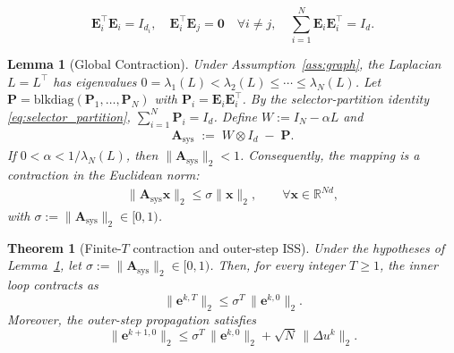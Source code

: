 \documentclass[10pt,a4paper]{amsart}
\newtheorem{lemma}{Lemma}
\newtheorem{theorem}{Theorem}
\begin{document}
\begin{equation}\label{eq:selector_partition}
\mathbf{E}_i^\top \mathbf{E}_i = I_{d_i},
\quad
\mathbf{E}_i^\top \mathbf{E}_j = \mathbf{0}\quad \forall i\neq j,
\quad
\sum_{i=1}^N \mathbf{E}_i \mathbf{E}_i^\top = I_d.
\end{equation}

\begin{lemma}[Global Contraction]\label{lem:contraction}
Under Assumption~\ref{ass:graph}, the Laplacian \(L=L^\top\) has eigenvalues \(0=\lambda_1(L)<\lambda_2(L)\le\cdots\le\lambda_N(L)\).
Let $\mathbf{P}=\mathrm{blkdiag}(\mathbf{P}_1,\dots,\mathbf{P}_N)$ with $\mathbf{P}_i=\mathbf{E}_i\mathbf{E}_i^\top$. By the selector-partition identity \eqref{eq:selector_partition}, $\sum_{i=1}^N \mathbf{P}_i = I_d$. Define $W := I_N - \alpha L$ and
\begin{align}
\mathbf{A}_{\mathrm{sys}} \;:=\; W\otimes I_d \;-\; \mathbf{P}.
\end{align}
If $0<\alpha<1/\lambda_N(L)$, then $\|\mathbf{A}_{\mathrm{sys}}\|_2<1$. Consequently, the mapping is a contraction in the Euclidean norm:
\begin{align}
\|\mathbf{A}_{\mathrm{sys}}\mathbf{x}\|_2 \le \sigma \|\mathbf{x}\|_2,\qquad \forall \mathbf{x}\in\mathbb{R}^{Nd},
\end{align}
with $\sigma:=\|\mathbf{A}_{\mathrm{sys}}\|_2\in[0,1)$.
\end{lemma}

\begin{theorem}[Finite-$T$ contraction and outer-step ISS]\label{thm:iss_2ts}
Under the hypotheses of Lemma~\ref{lem:contraction}, let $\sigma:=\|\mathbf{A}_{\mathrm{sys}}\|_2\in[0,1)$. Then, for every integer $T\ge1$, the inner loop contracts as
\begin{equation}\label{eq:inner_contr_T}
\|\mathbf{e}^{k,T}\|_2 \le \sigma^{T}\,\|\mathbf{e}^{k,0}\|_2.
\end{equation}
Moreover, the outer-step propagation satisfies
\begin{equation}\label{eq:outer_iss}
\|\mathbf{e}^{k+1,0}\|_2
\le \sigma^{T}\,\|\mathbf{e}^{k,0}\|_2 + \sqrt{N}\,\|\Delta u^{k}\|_2.
\end{equation}
\end{theorem}
\end{document}
